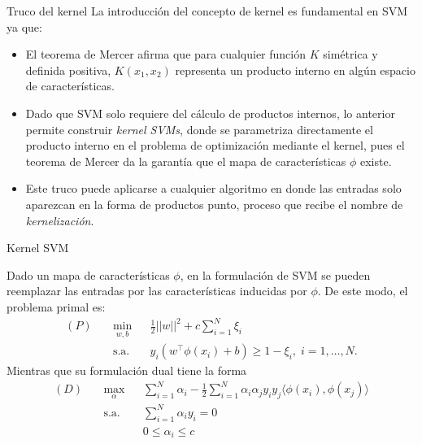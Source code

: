 \documentclass[9pt, handout]{beamer}
\begin{document}
\begin{frame}{Truco del kernel}
	La introducción del concepto de kernel es fundamental en SVM ya que:
	
	\begin{itemize}
		\item El teorema de Mercer afirma que para cualquier función $K$ simétrica y definida positiva, $K(x_1,x_2)$ representa un producto interno en algún espacio de características.\pause
		\item  Dado que SVM solo requiere del cálculo de productos internos, lo anterior permite construir \emph{kernel SVMs}, donde se parametriza directamente el producto interno en el problema de optimización mediante el kernel, pues el teorema de Mercer da la garantía que el mapa de características $\phi$ existe.\pause
		\item Este truco puede aplicarse a cualquier algoritmo en donde las entradas solo aparezcan en la forma de productos punto, proceso que recibe el nombre de \emph{kernelización}. 
	\end{itemize}
	 
\end{frame}

\begin{frame}{Kernel SVM}

Dado un mapa de características $\phi$, en la formulación de SVM se pueden reemplazar las entradas por las características inducidas por $\phi$. De este modo, el problema primal es:
\begin{equation*}
\begin{aligned}
(P)\quad & \underset{w,b}{\text{min}}
& & \frac{1}{2}||w||^2 + c\sum\limits_{i=1}^{N} \xi_i\\
& \text{s.a.}
& & y_i (w^\top \phi(x_i) +b) \geq 1- \xi_i, \; i = 1, \ldots, N.
\end{aligned}
\end{equation*}\pause
Mientras que su formulación dual tiene la forma
\begin{equation*}
\begin{aligned}
(D)\quad & \underset{\alpha}{\text{max}}
& & \sum\limits_{i=1}^{N}\alpha_i - \frac{1}{2} \sum\limits_{i=1}^{N} \alpha_i \alpha_j y_i y_j \langle\phi(x_i), \phi(x_j)\rangle\\
& \text{s.a.}
& & \sum\limits_{i=1}^{N} \alpha_i y_i= 0 \\
& &  &0 \leq \alpha_i \leq c
\end{aligned}
\end{equation*}


\end{frame}
\end{document}
